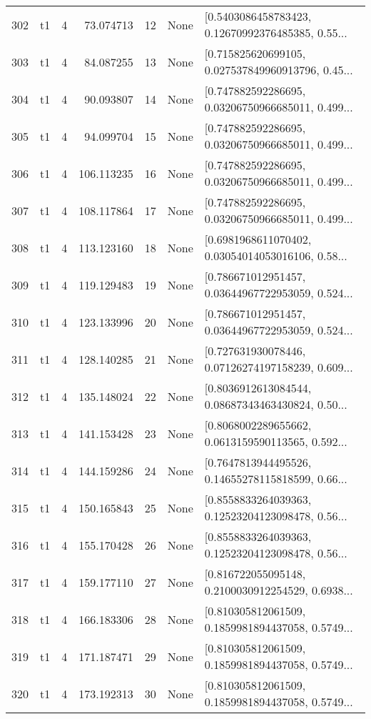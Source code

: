 \begin{tabular}{lllrlll}
302 &  t1 &   4 &   73.074713 &   12 &  None &  [0.5403086458783423, 0.12670992376485385, 0.55... \\
303 &  t1 &   4 &   84.087255 &   13 &  None &  [0.715825620699105, 0.027537849960913796, 0.45... \\
304 &  t1 &   4 &   90.093807 &   14 &  None &  [0.747882592286695, 0.03206750966685011, 0.499... \\
305 &  t1 &   4 &   94.099704 &   15 &  None &  [0.747882592286695, 0.03206750966685011, 0.499... \\
306 &  t1 &   4 &  106.113235 &   16 &  None &  [0.747882592286695, 0.03206750966685011, 0.499... \\
307 &  t1 &   4 &  108.117864 &   17 &  None &  [0.747882592286695, 0.03206750966685011, 0.499... \\
308 &  t1 &   4 &  113.123160 &   18 &  None &  [0.6981968611070402, 0.03054014053016106, 0.58... \\
309 &  t1 &   4 &  119.129483 &   19 &  None &  [0.786671012951457, 0.03644967722953059, 0.524... \\
310 &  t1 &   4 &  123.133996 &   20 &  None &  [0.786671012951457, 0.03644967722953059, 0.524... \\
311 &  t1 &   4 &  128.140285 &   21 &  None &  [0.727631930078446, 0.07126274197158239, 0.609... \\
312 &  t1 &   4 &  135.148024 &   22 &  None &  [0.8036912613084544, 0.08687343463430824, 0.50... \\
313 &  t1 &   4 &  141.153428 &   23 &  None &  [0.8068002289655662, 0.0613159590113565, 0.592... \\
314 &  t1 &   4 &  144.159286 &   24 &  None &  [0.7647813944495526, 0.14655278115818599, 0.66... \\
315 &  t1 &   4 &  150.165843 &   25 &  None &  [0.8558833264039363, 0.12523204123098478, 0.56... \\
316 &  t1 &   4 &  155.170428 &   26 &  None &  [0.8558833264039363, 0.12523204123098478, 0.56... \\
317 &  t1 &   4 &  159.177110 &   27 &  None &  [0.816722055095148, 0.2100030912254529, 0.6938... \\
318 &  t1 &   4 &  166.183306 &   28 &  None &  [0.810305812061509, 0.1859981894437058, 0.5749... \\
319 &  t1 &   4 &  171.187471 &   29 &  None &  [0.810305812061509, 0.1859981894437058, 0.5749... \\
320 &  t1 &   4 &  173.192313 &   30 &  None &  [0.810305812061509, 0.1859981894437058, 0.5749... \\

\end{tabular}
